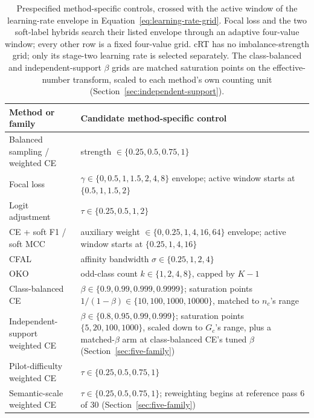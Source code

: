 \documentclass[11pt]{article}
\begin{document}
\begin{table}[ht]
  \centering
  \footnotesize
  \begin{tabularx}{\linewidth}{@{}lX@{}}
    \toprule
    Method or family & Candidate method-specific control \\
    \midrule
    Balanced sampling / weighted CE & strength $\in\{0.25,0.5,0.75,1\}$ \\
    Focal loss & $\gamma\in\{0,0.5,1,1.5,2,4,8\}$ envelope; active window starts at $\{0.5,1,1.5,2\}$ \\
    Logit adjustment & $\tau\in\{0.25,0.5,1,2\}$ \\
    CE + soft F1 / soft MCC & auxiliary weight $\in\{0,0.25,1,4,16,64\}$ envelope; active window starts at $\{0.25,1,4,16\}$ \\
    CFAL & affinity bandwidth $\sigma\in\{0.25,1,2,4\}$ \\
    OKO & odd-class count $k\in\{1,2,4,8\}$, capped by $K-1$ \\
    Class-balanced CE & $\beta\in\{0.9,0.99,0.999,0.9999\}$; saturation points $1/(1-\beta)\in\{10,100,1000,10000\}$, matched to $n_c$'s range \\
    Independent-support weighted CE & $\beta\in\{0.8,0.95,0.99,0.999\}$; saturation points $\{5,20,100,1000\}$, scaled down to $G_c$'s range, plus a matched-$\beta$ arm at class-balanced CE's tuned $\beta$ (Section~\ref{sec:five-family}) \\
    Pilot-difficulty weighted CE & $\tau\in\{0.25,0.5,0.75,1\}$ \\
    Semantic-scale weighted CE & $\tau\in\{0.25,0.5,0.75,1\}$; reweighting begins at reference pass 6 of 30 (Section~\ref{sec:five-family}) \\
    \bottomrule
  \end{tabularx}
  \caption{Prespecified method-specific controls, crossed with the active window of the learning-rate envelope in Equation~\eqref{eq:learning-rate-grid}. Focal loss and the two soft-label hybrids search their listed envelope through an adaptive four-value window; every other row is a fixed four-value grid. cRT has no imbalance-strength grid; only its stage-two learning rate is selected separately. The class-balanced and independent-support $\beta$ grids are matched saturation points on the effective-number transform, scaled to each method's own counting unit (Section~\ref{sec:independent-support}).}
  \label{tab:controls}
\end{table}
\end{document}
